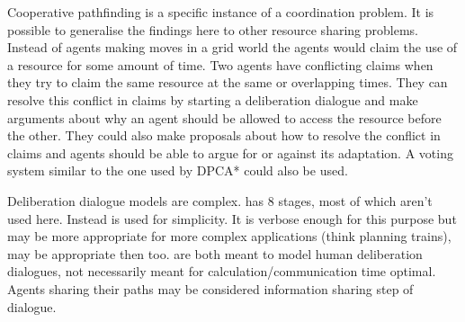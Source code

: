 Cooperative pathfinding is a specific instance of a coordination problem. It is
possible to generalise the findings here to other resource sharing problems.
Instead of agents making moves in a grid world the agents would claim the use
of a resource for some amount of time. Two agents have conflicting claims when
they try to claim the same resource at the same or overlapping times. They can
resolve this conflict in claims by starting a deliberation dialogue and make
arguments about why an agent should be allowed to access the resource before
the other. They could also make proposals about how to resolve the conflict in
claims and agents should be able to argue for or against its adaptation. A
voting system similar to the one used by DPCA* could also be used.




Deliberation dialogue models are complex. \cite{mcburney2007} has 8 stages,
most of which aren't used here. Instead \cite{dunin-keplicz2011} is used for
simplicity. It is verbose enough for this purpose but \cite{mcburney2007} may
be more appropriate for more complex applications (think planning trains),
\cite{walton2014} may be appropriate then too. \cite{mcburney2007,walton2014}
are both meant to model human deliberation dialogues, not necessarily meant for
calculation/communication time optimal. Agents sharing their paths may be
considered information sharing step of dialogue.

